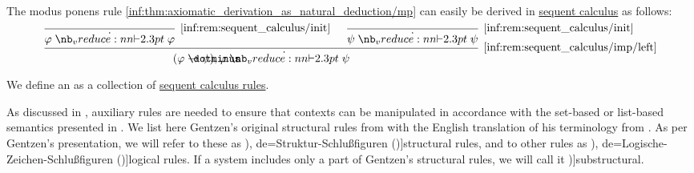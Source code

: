 \begin{example}\label{ex:sequent_calculus_modus_ponens}
  The modus ponens rule \ref{inf:thm:axiomatic_derivation_as_natural_deduction/mp} can easily be derived in \hyperref[rem:sequent_calculus]{sequent calculus} as follows:
  \begin{equation*}
    \begin{prooftree}
      \infer0[\ref{inf:rem:sequent_calculus/init}]{ \varphi \synvdash \varphi }
      \infer0[\ref{inf:rem:sequent_calculus/init}]{ \psi \synvdash \psi }
      \infer2[\ref{inf:rem:sequent_calculus/imp/left}]{ (\varphi \synimplies \psi), \varphi \synvdash \psi }
    \end{prooftree}
  \end{equation*}
\end{example}

\begin{definition}\label{def:abstract_sequent_calculus_system}\mimprovised
  We define an  as a collection of \hyperref[def:sequent_calculus_rule]{sequent calculus rules}.

  As discussed in , auxiliary rules are needed to ensure that contexts can be manipulated in accordance with the set-based or list-based semantics presented in . We list here Gentzen's original structural rules from \cite[192]{Gentzen1935LogischeSchließen} with the English translation of his terminology from \cite[296]{Gentzen1964LogicalDeduction}. As per Gentzen's presentation, we will refer to these as \term[ru=структурные правила (\cite[97]{КолмогоровДрагалин2006Логика}), de=Struktur-Schlu\ss{}figuren (\cite[191]{Gentzen1935LogischeSchließen})]{structural rules}, and to other rules as \term[ru=логические правила (\cite[97]{КолмогоровДрагалин2006Логика}), de=Logische-Zeichen-Schlu\ss{}figuren (\cite[191]{Gentzen1935LogischeSchließen})]{logical rules}. If a system includes only a part of Gentzen's structural rules, we will call it \term[en=substructural (\cite[91]{TroelstraSchwichtenberg2000BasicProofTheory})]{substructural}.


\end{definition}
